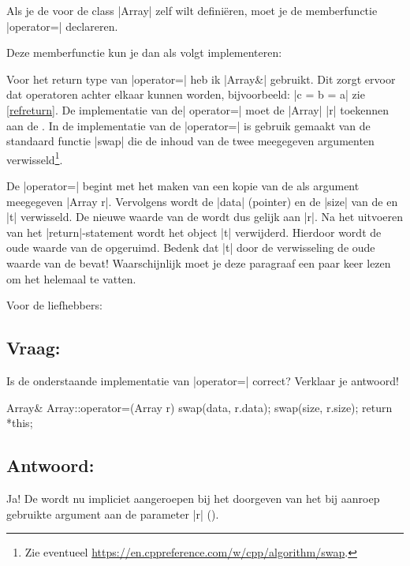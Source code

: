 \begin{cpplstShortInline}

Als je de  voor de class |Array| zelf wilt definiëren, moet je de memberfunctie \hbox{|operator=|} declareren.

Deze memberfunctie kun je dan als volgt implementeren:

Voor het return type van |operator=| heb ik |Array&| gebruikt.
Dit zorgt ervoor dat  operatoren achter elkaar  kunnen worden, bijvoorbeeld: |c = b = a| zie \cref{refreturn}.
De implementatie van de| operator=| moet de |Array| |r| toekennen aan de .
In de implementatie van de |operator=| is gebruik gemaakt van de standaard functie |swap| die de inhoud van de twee meegegeven argumenten verwisseld\footnote{%
	Zie eventueel \url{https://en.cppreference.com/w/cpp/algorithm/swap}.
}.

De |operator=| begint met het maken van een kopie van de als argument meegegeven |Array r|.
Vervolgens wordt de |data| (pointer) en de |size| van de  en |t| verwisseld.
De nieuwe waarde van de  wordt dus gelijk aan |r|.
Na het uitvoeren van het |return|\hyp{}statement wordt het object |t| verwijderd.
Hierdoor wordt de oude waarde van de  opgeruimd.
Bedenk dat |t| door de verwisseling de oude waarde van de  bevat! 
Waarschijnlijk moet je deze paragraaf een paar keer lezen om het helemaal te vatten.

Voor de liefhebbers: 
\subsection*{Vraag:}
Is de onderstaande implementatie van |operator=| correct? Verklaar je antwoord!
\begin{cpplstfragment}
Array& Array::operator=(Array r) {
    swap(data, r.data);
    swap(size, r.size);
    return *this;
}
\end{cpplstfragment}

\subsection*{Antwoord:}
Ja! De  wordt nu impliciet aangeroepen bij het doorgeven van het bij aanroep gebruikte argument aan de parameter |r| ().


\end{cpplstShortInline}
